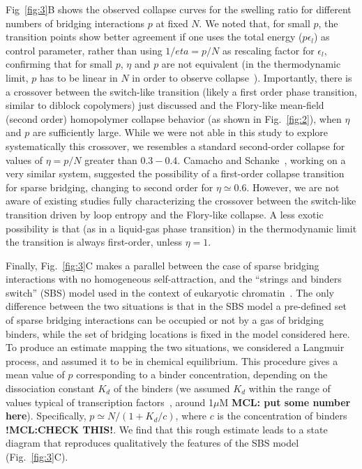 \documentclass[
preprint,
a4paper,
12pt,
superscriptaddress,
pre]{revtex4}
\begin{document}
%
Fig~\ref{fig:3}B shows the observed collapse curves for the swelling
ratio for different numbers of bridging interactions $p$ at fixed
$N$. 
%
We noted that, for small $p$, the transition points show better
agreement if one uses the total energy ($p \epsilon_l$) as control
parameter, rather than using $1/eta=p/N$ as rescaling factor for
$\epsilon_l$, confirming that for small $p$, $\eta$ and $p$ are not
equivalent (in the thermodynamic limit, $p$ has to be linear in $N$ in
order to observe collapse~\cite{Kantor1996,Camacho1997}).
%
Importantly, there is a crossover between the switch-like transition
(likely a first order phase transition, similar to diblock copolymers)
just discussed and the Flory-like mean-field (second order)
homopolymer collapse behavior (as shown in Fig.~\ref{fig:2}), when
$\eta$ and $p$ are sufficiently large.
While we were not able in this study to explore systematically this
crossover, we resembles a standard second-order collapse for values of
$\eta = p/N$ greater than $0.3-0.4$.
Camacho and Schanke~\cite{Camacho1997}, working on a very similar
system, suggested the possibility of a first-order collapse transition
for sparse bridging, changing to second order for $\eta \simeq 0.6$.
However, we are not aware of existing studies fully characterizing the
crossover between the switch-like transition driven by loop entropy
and the Flory-like collapse. A less exotic possibility is that (as in
a liquid-gas phase transition) in the thermodynamic limit the
transition is always first-order, unless $\eta=1$.
%
%



Finally, Fig.~\ref{fig:3}C makes a parallel between the case of
sparse bridging interactions with no homogeneous self-attraction, and
the ``strings and binders switch'' (SBS) model used in the context of
eukaryotic chromatin~\cite{Barbieri2012,Barbieri2013b}.
The only difference between the two situations is that in the SBS
model a pre-defined set of sparse bridging interactions can be
occupied or not by a gas of bridging binders, while the set of
bridging locations is fixed in the model considered here. To produce
an estimate mapping the two situations, we considered a Langmuir
process, and assumed it to be in chemical equilibrium.
%
This procedure gives a mean value of $p$ corresponding to a binder
concentration, depending on the dissociation constant $K_d$ of the
binders (we assumed $K_d$ within the range of values typical of
transcription factors~\cite{Buchler29042003}, around 1$\mu$M
\textbf{MCL: put some number here}). Specifically, $p \simeq N /
(1+K_d/c)$, where $c$ is the concentration of binders
\textbf{!MCL:CHECK THIS!}.
%
We find that this rough estimate leads to a state diagram that
reproduces qualitatively the features of the SBS model
(Fig.~\ref{fig:3}C).
\end{document}

